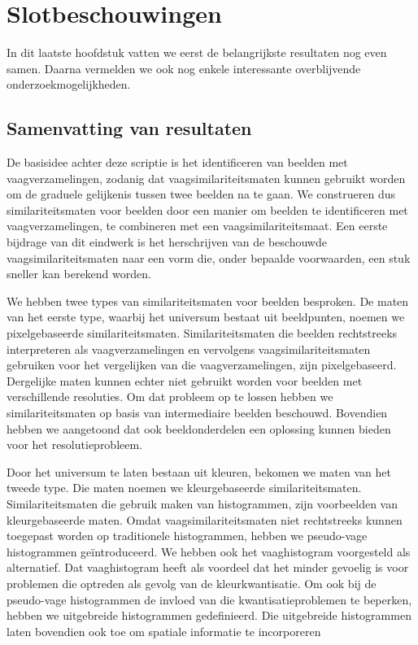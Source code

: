 \chapter{Slotbeschouwingen}

In dit laatste hoofdstuk vatten we eerst de belangrijkste resultaten
nog even samen. Daarna vermelden we ook nog enkele interessante overblijvende
onderzoekmogelijkheden.

\section{Samenvatting van resultaten}

De basisidee achter deze scriptie is het identificeren van beelden
met vaagverzamelingen, zodanig dat vaagsimilariteitsmaten kunnen gebruikt worden
om de graduele gelijkenis tussen twee beelden na te gaan. 
We construeren dus similariteitsmaten voor beelden door een manier om beelden te
identificeren met vaagverzamelingen, te combineren met een vaagsimilariteitsmaat.
Een eerste bijdrage van dit eindwerk is het herschrijven van de beschouwde
vaagsimilariteitsmaten naar een vorm die, onder bepaalde voorwaarden, een stuk
sneller kan berekend worden. 

We hebben twee types van similariteitsmaten voor beelden besproken.
De maten van het eerste type, waarbij het universum bestaat uit beeldpunten, 
noemen we pixelgebaseerde similariteitsmaten. Similariteitsmaten die 
beelden rechtstreeks interpreteren als vaagverzamelingen en vervolgens 
vaagsimilariteitsmaten gebruiken voor het vergelijken van die vaagverzamelingen, 
zijn pixelgebaseerd. Dergelijke maten kunnen echter niet gebruikt worden voor 
beelden met verschillende resoluties. Om dat probleem op te lossen hebben we 
similariteitsmaten op basis van intermediaire beelden beschouwd. Bovendien 
hebben we aangetoond dat ook beeldonderdelen een oplossing kunnen bieden voor 
het resolutieprobleem. 

Door het universum te laten bestaan uit kleuren, bekomen we maten van het tweede
type. Die maten noemen we kleurgebaseerde similariteitsmaten. Similariteitsmaten
die gebruik maken van histogrammen, zijn voorbeelden van kleurgebaseerde 
maten. Omdat vaagsimilariteitsmaten niet rechtstreeks kunnen
toegepast worden op traditionele histogrammen, hebben we pseudo-vage histogrammen
ge\"introduceerd. We hebben ook het vaaghistogram voorgesteld als alternatief.
Dat vaaghistogram heeft als voordeel dat het minder gevoelig is voor
problemen die optreden als gevolg van de kleurkwantisatie. Om ook bij de pseudo-vage
histogrammen de invloed van die kwantisatieproblemen te beperken, hebben we 
uitgebreide histogrammen gedefinieerd. Die uitgebreide histogrammen laten bovendien
ook toe om spatiale informatie te incorporeren

